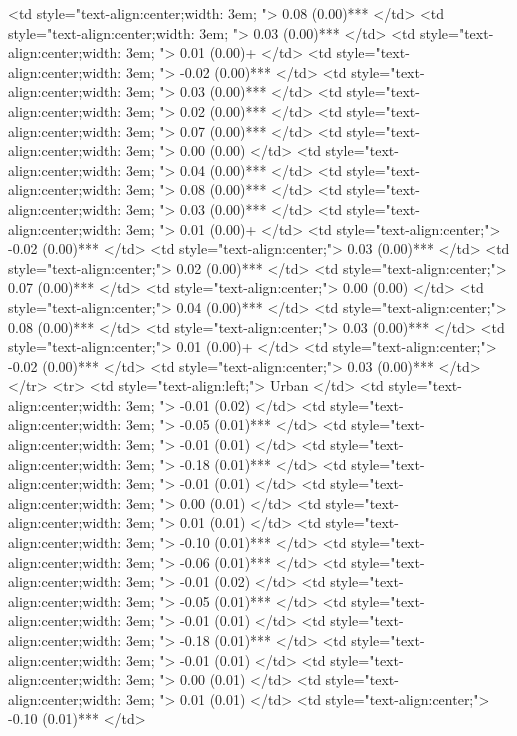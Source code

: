    <td style="text-align:center;width: 3em; "> 0.08 (0.00)*** </td>
   <td style="text-align:center;width: 3em; "> 0.03 (0.00)*** </td>
   <td style="text-align:center;width: 3em; "> 0.01 (0.00)+ </td>
   <td style="text-align:center;width: 3em; "> -0.02 (0.00)*** </td>
   <td style="text-align:center;width: 3em; "> 0.03 (0.00)*** </td>
   <td style="text-align:center;width: 3em; "> 0.02 (0.00)*** </td>
   <td style="text-align:center;width: 3em; "> 0.07 (0.00)*** </td>
   <td style="text-align:center;width: 3em; "> 0.00 (0.00) </td>
   <td style="text-align:center;width: 3em; "> 0.04 (0.00)*** </td>
   <td style="text-align:center;width: 3em; "> 0.08 (0.00)*** </td>
   <td style="text-align:center;width: 3em; "> 0.03 (0.00)*** </td>
   <td style="text-align:center;width: 3em; "> 0.01 (0.00)+ </td>
   <td style="text-align:center;"> -0.02 (0.00)*** </td>
   <td style="text-align:center;"> 0.03 (0.00)*** </td>
   <td style="text-align:center;"> 0.02 (0.00)*** </td>
   <td style="text-align:center;"> 0.07 (0.00)*** </td>
   <td style="text-align:center;"> 0.00 (0.00) </td>
   <td style="text-align:center;"> 0.04 (0.00)*** </td>
   <td style="text-align:center;"> 0.08 (0.00)*** </td>
   <td style="text-align:center;"> 0.03 (0.00)*** </td>
   <td style="text-align:center;"> 0.01 (0.00)+ </td>
   <td style="text-align:center;"> -0.02 (0.00)*** </td>
   <td style="text-align:center;"> 0.03 (0.00)*** </td>
  </tr>
  <tr>
   <td style="text-align:left;"> Urban </td>
   <td style="text-align:center;width: 3em; "> -0.01 (0.02) </td>
   <td style="text-align:center;width: 3em; "> -0.05 (0.01)*** </td>
   <td style="text-align:center;width: 3em; "> -0.01 (0.01) </td>
   <td style="text-align:center;width: 3em; "> -0.18 (0.01)*** </td>
   <td style="text-align:center;width: 3em; "> -0.01 (0.01) </td>
   <td style="text-align:center;width: 3em; "> 0.00 (0.01) </td>
   <td style="text-align:center;width: 3em; "> 0.01 (0.01) </td>
   <td style="text-align:center;width: 3em; "> -0.10 (0.01)*** </td>
   <td style="text-align:center;width: 3em; "> -0.06 (0.01)*** </td>
   <td style="text-align:center;width: 3em; "> -0.01 (0.02) </td>
   <td style="text-align:center;width: 3em; "> -0.05 (0.01)*** </td>
   <td style="text-align:center;width: 3em; "> -0.01 (0.01) </td>
   <td style="text-align:center;width: 3em; "> -0.18 (0.01)*** </td>
   <td style="text-align:center;width: 3em; "> -0.01 (0.01) </td>
   <td style="text-align:center;width: 3em; "> 0.00 (0.01) </td>
   <td style="text-align:center;width: 3em; "> 0.01 (0.01) </td>
   <td style="text-align:center;"> -0.10 (0.01)*** </td>

